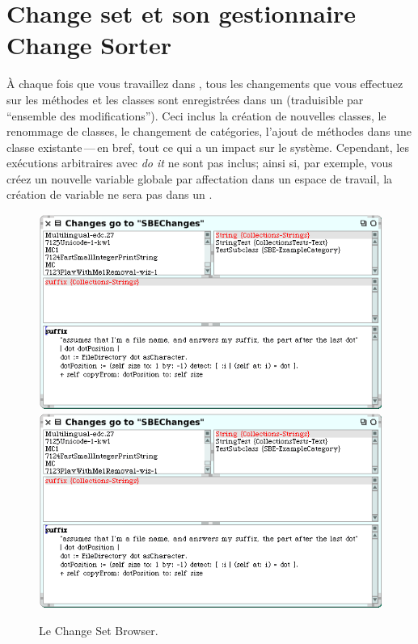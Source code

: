 \documentclass[a4paper,10pt,twoside]{book}
\begin{document}
\section{Change set et son gestionnaire Change Sorter}
\label{sec:env:changeSet} %

\`A chaque fois que vous travaillez dans \sq, tous les changements que vous effectuez
sur les m\'ethodes et les classes sont enregistr\'ees dans un
 (traduisible par ``ensemble des modifications'').
Ceci inclus la cr\'eation de nouvelles classes, le renommage de classes, le changement de
cat\'egories, l'ajout de m\'ethodes dans une classe existante\,---\,en bref, tout ce qui a un impact sur le syst\`eme.
Cependant, les ex\'ecutions arbitraires avec \emph{do it} ne sont pas inclus; ainsi
si, par exemple, vous cr\'eez un nouvelle variable globale par affectation dans 
un espace de travail, la cr\'eation de variable ne sera pas dans un 
.

\begin{figure}[btp]
	\begin{center}
	\ifluluelse
		{\includegraphics [width=\textwidth]{changeSetBrowser}}
		{\includegraphics[scale=0.7]{changeSetBrowser}}
	\end{center}
	\caption{Le Change Set Browser.}
	\label{fig:changeSetBrowser}
\end{figure}
\end{document}
